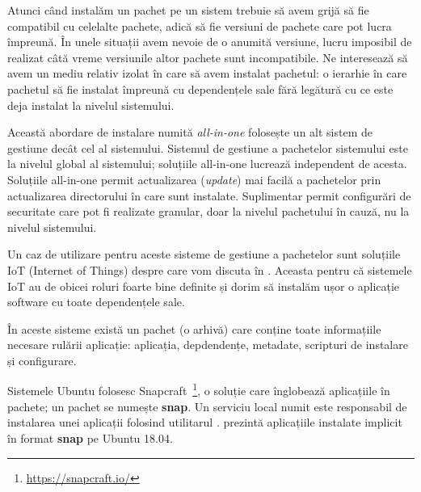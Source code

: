 Atunci când instalăm un pachet pe un sistem trebuie să avem grijă să fie compatibil cu celelalte pachete, adică să fie versiuni de pachete care pot lucra împreună. În unele situații avem nevoie de o anumită versiune, lucru imposibil de realizat câtă vreme versiunile altor pachete sunt incompatibile. Ne interesează să avem un mediu relativ izolat în care să avem instalat pachetul: o ierarhie în care pachetul să fie instalat împreună cu dependențele sale fără legătură cu ce este deja instalat la nivelul sistemului.

Această abordare de instalare numită \textit{all-in-one} folosește un alt sistem de gestiune decât cel al sistemului. Sistemul de gestiune a pachetelor sistemului este la nivelul global al sistemului; soluțiile all-in-one lucrează independent de acesta. Soluțiile all-in-one permit actualizarea (\textit{update}) mai facilă a pachetelor prin actualizarea directorului în care sunt instalate. Suplimentar permit configurări de securitate care pot fi realizate granular, doar la nivelul pachetului în cauză, nu la nivelul sistemului.

Un caz de utilizare pentru aceste sisteme de gestiune a pachetelor sunt soluțiile IoT (Internet of Things) despre care vom discuta în . Aceasta pentru că sistemele IoT au de obicei roluri foarte bine definite și dorim să instalăm ușor o aplicație software cu toate dependențele sale.

În aceste sisteme există un pachet (o arhivă) care conține toate informațiile necesare rulării aplicație: aplicația, depdendențe, metadate, scripturi de instalare și configurare.

Sistemele Ubuntu folosesc Snapcraft~\footnote{\url{https://snapcraft.io/}}, o soluție care înglobează aplicațiile în pachete; un pachet se numește \textbf{snap}. Un serviciu local numit  este responsabil de instalarea unei aplicații folosind utilitarul .  prezintă aplicațiile instalate implicit în format \textbf{snap} pe Ubuntu 18.04.


